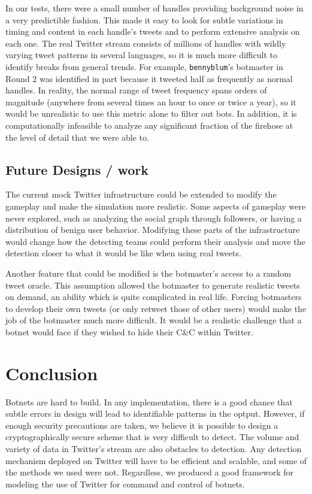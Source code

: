 \documentclass[11pt, oneside]{article} %
\numberwithin{equation}{section} %
\numberwithin{figure}{section} %
\numberwithin{table}{section} %
\renewcommand{\c}[1]{\texttt{#1}}
\newcommand{\teambb}{\c{bennyblum}}
\begin{document}
In our tests, there were a small number of handles providing background noise in a very predictible fashion. This made it easy to look for subtle variations in timing and content in each handle's tweets and to perform extensive analysis on each one. The real Twitter stream consists of millions of handles with wildly varying tweet patterns in several languages, so it is much more difficult to identify breaks from general trends. For example, \teambb{}'s botmaster in Round 2 was identified in part because it tweeted half as frequently as normal handles. In reality, the normal range of tweet frequency spans orders of magnitude (anywhere from several times an hour to once or twice a year), so it would be unrealistic to use this metric alone to filter out bots. In addition, it is computationally infeasible to analyze any significant fraction of the firehose at the level of detail that we were able to.
        
        \subsection{Future Designs / work}

        The current mock Twitter infrastructure could be extended to modify the gameplay and make the simulation more realistic. Some aspects of gameplay were never explored, such as analyzing the social graph through followers, or having a distribution of benign user behavior. Modifying these parts of the infrastructure would change how the detecting teams could perform their analysis and move the detection closer to what it would be like when using real tweets.

		Another feature that could be modified is the botmaster's access to a random tweet oracle. This assumption allowed the botmaster to generate realistic tweets on demand, an ability which is quite complicated in real life. Forcing botmasters to develop their own tweets (or only retweet those of other users) would make the job of the botmaster much more difficult. It would be a realistic challenge that a botnet would face if they wished to hide their C\&C within Twitter.

\section{Conclusion}
     	Botnets are hard to build. In any implementation, there is a good chance that subtle errors in design will lead to identifiable patterns in the optput. However, if enough security precautions are taken, we believe it is possible to design a cryptographically secure scheme that is very difficult to detect. The volume and variety of data in Twitter's stream are also obstacles to detection. Any detection mechanism deployed on Twitter will have to be efficient and scalable, and some of the methods we used were not. Regardless, we produced a good framework for modeling the use of Twitter for command and control of botnets.

        

\clearpage
\renewcommand\bibsection{\section{References}}
\renewcommand*{\bibfont}{\footnotesize}
\setlength\bibsep{3pt}


\end{document}
